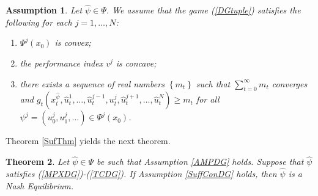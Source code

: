 \documentclass[3p]{elsarticle}
\newtheorem{thm}{Theorem}
\newtheorem{assu}[thm]{Assumption}
\begin{document}
	
	
	
	
	
	\begin{assu}
		Let $\hat\psi\in\Psi$. We assume that the game (\ref{DGtuple}) satisfies the following for each $j=1,\dots,N$: 
		\begin{enumerate}\label{SuffConDG}
			\item[(a)]   $\Psi^j(x_0)$ is convex;
			
			\item[(b)]	
			the performance index $v^j$ is concave;
			
			\item[(c)] there exists a sequence of real  numbers $\left\lbrace m_t\right\rbrace $ such that $\sum_{t=0}^\infty m_t$ converges and 
			$
			g_t(x_t^{\hat\psi},\hat u_t^1,\dots, \hat u_{t}^{j-1},u_t^j,\hat u_t^{j+1},\dots, \hat u_t^N)\ge m_t
			$  for all $\psi^j=(u_0^j,u_1^j,\dots)\in\Psi^j(x_0)$.
		\end{enumerate}
	\end{assu}
	
	
	
	
	
	Theorem \ref{SufThm} yields the next theorem.
	
	\begin{thm}\label{DGSufThm}
		Let $\hat{\psi}\in\Psi$ be such that Assumption \ref{AMPDG} holds. Suppose that $\hat\psi$ satisfies  (\ref{MPXDG})-(\ref{TCDG}). If Assumption \ref{SuffConDG} holds, then $\hat\psi$ is a Nash Equilibrium.
	\end{thm}
	
	
	
\end{document}
